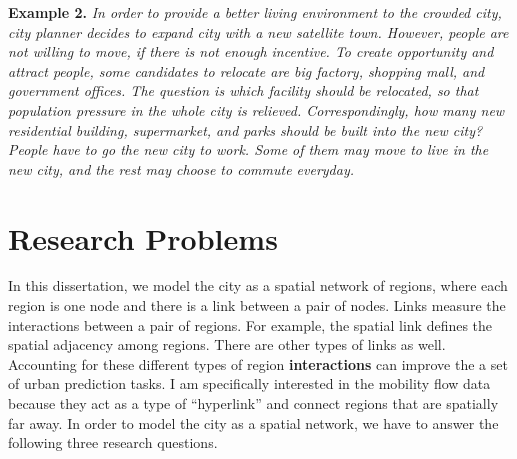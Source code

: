\textbf{Example 2.} \emph{In order to provide a better living environment to the crowded city, city planner decides to expand city with a new satellite town. However, people are not willing to move, if there is not enough incentive. To create opportunity and attract people, some candidates to relocate are big factory, shopping mall, and government offices. The question is which facility should be relocated, so that population pressure in the whole city is relieved.  Correspondingly, how many new residential building, supermarket, and parks should be built into the new city? People have to go the new city to work. Some of them may move to live in the new city, and the rest may choose to commute everyday.}





\section{Research Problems}
\label{sec:qa}


In this dissertation, we model the city as a spatial network of regions, where each region is one node and there is a link between a pair of nodes. Links measure the interactions between a pair of regions. For example, the spatial link defines the spatial adjacency among regions. There are other types of links as well.  Accounting for these different types of region \textbf{interactions} can improve the a set of urban prediction tasks. I am specifically interested in the mobility flow data because they act as a type of ``hyperlink'' and connect regions that are spatially far away. In order to model the city as a spatial network, we have to answer the following three research questions.

